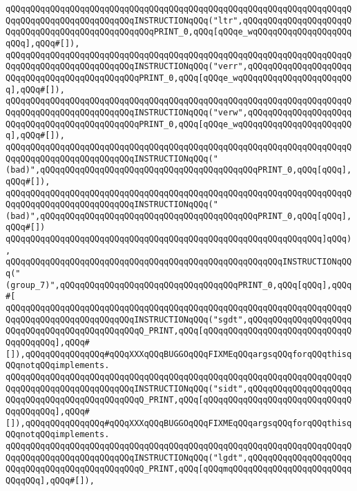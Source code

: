 \verb|qQQqqQQqqQQqqQQqqQQqqQQqqQQqqQQqqQQqqQQqqQQqqQQqqQQqqQQqqQQqqQQqqQQqqQQqqQQqqQQqqQQqqQQqqQQqqQQqINSTRUCTIONqQQq("ltr",qQQqqQQqqQQqqQQqqQQqqQQqqQQqqQQqqQQqqQQqqQQqqQQqqQQqPRINT_0,qQQq[qQQqe_wqQQqqQQqqQQqqQQqqQQqqQQq],qQQq#[]),|\newline
\verb|qQQqqQQqqQQqqQQqqQQqqQQqqQQqqQQqqQQqqQQqqQQqqQQqqQQqqQQqqQQqqQQqqQQqqQQqqQQqqQQqqQQqqQQqqQQqqQQqINSTRUCTIONqQQq("verr",qQQqqQQqqQQqqQQqqQQqqQQqqQQqqQQqqQQqqQQqqQQqqQQqPRINT_0,qQQq[qQQqe_wqQQqqQQqqQQqqQQqqQQqqQQq],qQQq#[]),|\newline
\verb|qQQqqQQqqQQqqQQqqQQqqQQqqQQqqQQqqQQqqQQqqQQqqQQqqQQqqQQqqQQqqQQqqQQqqQQqqQQqqQQqqQQqqQQqqQQqqQQqINSTRUCTIONqQQq("verw",qQQqqQQqqQQqqQQqqQQqqQQqqQQqqQQqqQQqqQQqqQQqqQQqPRINT_0,qQQq[qQQqe_wqQQqqQQqqQQqqQQqqQQqqQQq],qQQq#[]),|\newline
\verb|qQQqqQQqqQQqqQQqqQQqqQQqqQQqqQQqqQQqqQQqqQQqqQQqqQQqqQQqqQQqqQQqqQQqqQQqqQQqqQQqqQQqqQQqqQQqqQQqINSTRUCTIONqQQq("(bad)",qQQqqQQqqQQqqQQqqQQqqQQqqQQqqQQqqQQqqQQqqQQqPRINT_0,qQQq[qQQq],qQQq#[]),|\newline
\verb|qQQqqQQqqQQqqQQqqQQqqQQqqQQqqQQqqQQqqQQqqQQqqQQqqQQqqQQqqQQqqQQqqQQqqQQqqQQqqQQqqQQqqQQqqQQqqQQqINSTRUCTIONqQQq("(bad)",qQQqqQQqqQQqqQQqqQQqqQQqqQQqqQQqqQQqqQQqqQQqPRINT_0,qQQq[qQQq],qQQq#[])|\newline
\verb|qQQqqQQqqQQqqQQqqQQqqQQqqQQqqQQqqQQqqQQqqQQqqQQqqQQqqQQqqQQqqQQq]qQQq),|\newline
\verb|qQQqqQQqqQQqqQQqqQQqqQQqqQQqqQQqqQQqqQQqqQQqqQQqqQQqqQQqINSTRUCTIONqQQq("(group_7)",qQQqqQQqqQQqqQQqqQQqqQQqqQQqqQQqqQQqPRINT_0,qQQq[qQQq],qQQq#[|\newline
\verb|qQQqqQQqqQQqqQQqqQQqqQQqqQQqqQQqqQQqqQQqqQQqqQQqqQQqqQQqqQQqqQQqqQQqqQQqqQQqqQQqqQQqqQQqqQQqqQQqINSTRUCTIONqQQq("sgdt",qQQqqQQqqQQqqQQqqQQqqQQqqQQqqQQqqQQqqQQqqQQqqQQqQ_PRINT,qQQq[qQQqqQQqqQQqqQQqqQQqqQQqqQQqqQQqqQQqqQQq],qQQq#[]),qQQqqQQqqQQqqQQq#qQQqXXXqQQqBUGGOqQQqFIXMEqQQqargsqQQqforqQQqthisqQQqnotqQQqimplements.|\newline
\verb|qQQqqQQqqQQqqQQqqQQqqQQqqQQqqQQqqQQqqQQqqQQqqQQqqQQqqQQqqQQqqQQqqQQqqQQqqQQqqQQqqQQqqQQqqQQqqQQqINSTRUCTIONqQQq("sidt",qQQqqQQqqQQqqQQqqQQqqQQqqQQqqQQqqQQqqQQqqQQqqQQqQ_PRINT,qQQq[qQQqqQQqqQQqqQQqqQQqqQQqqQQqqQQqqQQqqQQq],qQQq#[]),qQQqqQQqqQQqqQQq#qQQqXXXqQQqBUGGOqQQqFIXMEqQQqargsqQQqforqQQqthisqQQqnotqQQqimplements.|\newline
\verb|qQQqqQQqqQQqqQQqqQQqqQQqqQQqqQQqqQQqqQQqqQQqqQQqqQQqqQQqqQQqqQQqqQQqqQQqqQQqqQQqqQQqqQQqqQQqqQQqINSTRUCTIONqQQq("lgdt",qQQqqQQqqQQqqQQqqQQqqQQqqQQqqQQqqQQqqQQqqQQqqQQqQ_PRINT,qQQq[qQQqmqQQqqQQqqQQqqQQqqQQqqQQqqQQqqQQq],qQQq#[]),|\newline
